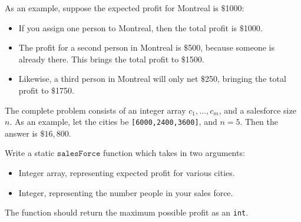 \documentclass{article}
\begin{document}
As an example, suppose the expected profit for Montreal is $\$$1000:
\begin{itemize}
\item If you assign one person to Montreal, then the total profit is $\$$1000.
\item The profit for a second person in Montreal is $\$$500, because someone is already there.  This brings the total profit to $\$$1500.
\item Likewise, a third person in Montreal will only net $\$$250, bringing the total profit to $\$$1750.
\end{itemize}
The complete problem consists of an integer array $c_1,\ldots,c_m$, and a salesforce size $n$.  As an example, let the cities be \texttt{[6000,2400,3600]}, and $n=5$.  Then the answer is $\$16,800$.

Write a static $\texttt{salesForce}$ function which takes in two arguments:
\begin{itemize}
\item Integer array, representing expected profit for various cities.
\item Integer, representing the number people in your sales force.
\end{itemize} 
The function should return the maximum possible profit as an \texttt{int}.
\end{document}
